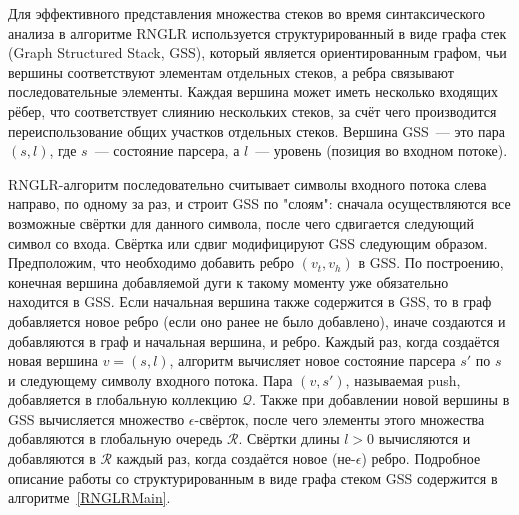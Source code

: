Для эффективного представления множества стеков во время синтаксического анализа в алгоритме RNGLR используется структурированный в виде графа стек (Graph Structured Stack, GSS), который является ориентированным графом, чьи вершины соответствуют  элементам отдельных стеков, а ребра связывают последовательные элементы. Каждая вершина может иметь несколько входящих рёбер, что соответствует слиянию нескольких стеков, за счёт чего производится переиспользование общих участков отдельных стеков. Вершина GSS~--- это пара $(s,l)$, где $s$~--- состояние парсера, а $l$~--- уровень (позиция во входном потоке).

RNGLR-алгоритм последовательно считывает символы входного потока слева направо, по одному за раз, и строит GSS по "слоям": сначала осуществляются все возможные свёртки для данного символа, после чего сдвигается следующий символ со входа. Свёртка или сдвиг модифицируют GSS следующим образом. Предположим, что необходимо добавить ребро $(v_t,v_h)$ в GSS. По построению, конечная вершина добавляемой дуги к такому моменту уже обязательно находится в GSS. Если начальная вершина также содержится в GSS, то в граф добавляется новое ребро (если оно ранее не было добавлено), иначе создаются и добавляются в граф и начальная вершина, и ребро. Каждый раз, когда создаётся новая вершина $v=(s,l)$, алгоритм вычисляет новое состояние парсера $s'$ по $s$ и следующему символу входного потока. Пара $(v,s')$, называемая push, добавляется в глобальную коллекцию $\mathcal{Q}$. Также при добавлении новой вершины в GSS вычисляется множество $\epsilon$-свёрток, после чего элементы этого множества добавляются в глобальную очередь $\mathcal{R}$. Свёртки длины $l>0$ вычисляются и добавляются в $\mathcal{R}$ каждый раз, когда создаётся новое (не-$\epsilon$) ребро. Подробное описание работы со структурированным в виде графа стеком GSS содержится в алгоритме~\ref{RNGLRMain}.

